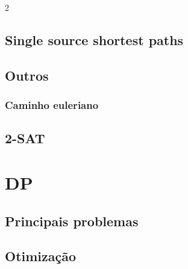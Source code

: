 \documentclass{article}
\newcounter{problema}[subsection]
\begin{document}
\begin{multicols}{2}


\subsection{Single source shortest paths}



\subsection{Outros}























\subsubsection{Caminho euleriano}


\subsection{2-SAT}


\clearpage

\section{DP}

\subsection{Principais problemas}


\subsection{Otimização}


\end{multicols}
\end{document}
